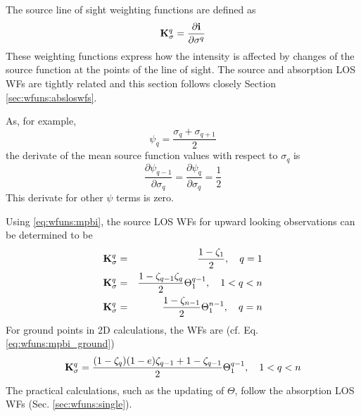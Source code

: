  \label{sec:wfuns:sourceloswfs}

 The source line of sight weighting functions are defined as
 \begin{equation}
   \mathbf{K}_{\sigma}^q =  \frac{\partial\mathbf{i}}{\partial \sigma^q}
  \label{eq:wfuns:sloswfs}
 \end{equation}
 These weighting functions express how the intensity is affected by
 changes of the source function at the points of the line of sight.
 The source and absorption LOS WFs are tightly related and this
 section follows closely Section \ref{sec:wfuns:absloswfs}.


  \label{sec:wfuns:single2}
  As, for example,
  \begin{equation}
    \psi_{q} = \frac{\sigma_q+\sigma_{q+1}}{2}
  \end{equation}
  the derivate of the mean source function values with respect to 
  $\sigma_q$ is
  \begin{equation}
    \frac{\partial \psi_{q-1}}{\partial \sigma_q} = 
    \frac{\partial \psi_q}{\partial \sigma_q} = \frac{1}{2}
   \label{eq:wfuns:dpsi}
  \end{equation}
  This derivate for other $\psi$ terms is zero.
 
  Using \ref{eq:wfuns:mpbi}, the source LOS WFs for upward looking
  observations can be determined to be
  \begin{eqnarray}
    \mathbf{K}_{\sigma}^q &=& \frac{1-\zeta_1}{2}, \quad q=1 
     \nonumber \\
    \mathbf{K}_{\sigma}^q &=& \frac{1-\zeta_{q-1}\zeta_q}{2} 
                                            \Theta^{q-1}_1, \quad 1<q<n \\
    \mathbf{K}_{\sigma}^q &=& \frac{1-\zeta_{n-1}}{2}\Theta^{n-1}_{1}, \quad q=n
     \nonumber
  \end{eqnarray}
  For ground points in 2D calculations, the WFs are (cf. Eq. 
  \ref{eq:wfuns:mpbi_ground})
  \begin{equation}
    \mathbf{K}_{\sigma}^q = \frac{(1-\zeta_q)(1-e)\zeta_{q-1}+1-\zeta_{q-1}}{2} 
                                            \Theta^{q-1}_1, \quad 1<q<n \\
  \end{equation}
  The practical calculations, such as the updating of $\Theta$, follow the
  absorption LOS WFs (Sec. \ref{sec:wfuns:single}).


